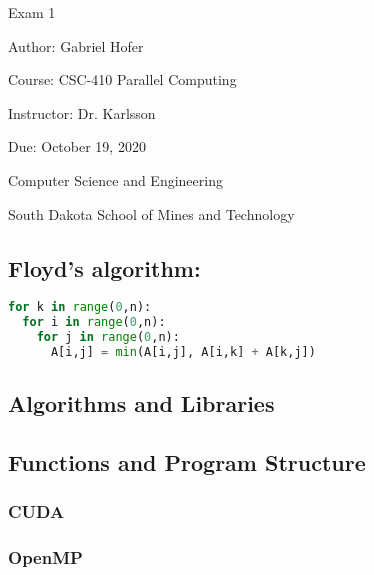 \documentclass[12pt]{article}
\begin{document}
\begin{titlepage}
   \begin{center}
       \vspace*{1cm}
       \Large
       Exam 1
       \normalsize

       \vspace{0.5cm}

       Author: Gabriel Hofer

       \vspace{0.5cm}

       Course: CSC-410 Parallel Computing

       \vspace{0.5cm}

       Instructor: Dr. Karlsson
       \vspace{0.5cm}

       Due: October 19, 2020

       \vfill

       Computer Science and Engineering\

       South Dakota School of Mines and Technology\
   \end{center}
\end{titlepage}
\newpage

\subsection*{Floyd's algorithm:}
\begin{lstlisting}[frame=single,language=Python, caption=Floyd's Algorithm]
for k in range(0,n):
  for i in range(0,n):
    for j in range(0,n):
      A[i,j] = min(A[i,j], A[i,k] + A[k,j])
\end{lstlisting}

\subsection*{Algorithms and Libraries}

\subsection*{Functions and Program Structure}

\subsubsection*{CUDA}
\subsubsection*{OpenMP}
\end{document}
